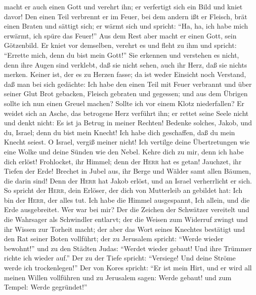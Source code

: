 macht er auch einen Gott und verehrt ihn; er verfertigt sich ein Bild
und kniet davor!  Den einen Teil verbrennt er im Feuer,
bei dem andern ißt er Fleisch, brät einen Braten und sättigt sich; er
wärmt sich und spricht: ``Ha, ha, ich habe mich erwärmt, ich spüre das
Feuer!''  Aus dem Rest aber macht er einen Gott, sein
Götzenbild. Er kniet vor demselben, verehrt es und fleht zu ihm und
spricht: ``Errette mich, denn du bist mein Gott!''  Sie
erkennen und verstehen es nicht, denn ihre Augen sind verklebt, daß sie
nicht sehen, auch ihr Herz, daß sie nichts merken. 
Keiner ist, der es zu Herzen fasse; da ist weder Einsicht noch Verstand,
daß man bei sich gedächte: Ich habe den einen Teil mit Feuer verbrannt
und über seiner Glut Brot gebacken, Fleisch gebraten und gegessen; und
aus dem Übrigen sollte ich nun einen Greuel machen? Sollte ich vor einem
Klotz niederfallen?  Er weidet sich an Asche, das
betrogene Herz verführt ihn; er rettet seine Seele nicht und denkt
nicht: Es ist ja Betrug in meiner Rechten!  Bedenke
solches, Jakob, und du, Israel; denn du bist mein Knecht! Ich habe dich
geschaffen, daß du mein Knecht seiest. O Israel, vergiß meiner nicht!
 Ich vertilge deine Übertretungen wie eine Wolke und
deine Sünden wie den Nebel. Kehre dich zu mir, denn ich habe dich
erlöst!  Frohlocket, ihr Himmel; denn der \textsc{Herr}
hat es getan! Jauchzet, ihr Tiefen der Erde! Brechet in Jubel aus, ihr
Berge und Wälder samt allen Bäumen, die darin sind! Denn der
\textsc{Herr} hat Jakob erlöst, und an Israel verherrlicht er sich.
 So spricht der \textsc{Herr}, dein Erlöser, der dich von
Mutterleib an gebildet hat: Ich bin der \textsc{Herr}, der alles tut.
Ich habe die Himmel ausgespannt, Ich allein, und die Erde ausgebreitet.
Wer war bei mir?  Der die Zeichen der Schwätzer vereitelt
und die Wahrsager als Schwindler entlarvt; der die Weisen zum Widerruf
zwingt und ihr Wissen zur Torheit macht;  der aber das
Wort seines Knechtes bestätigt und den Rat seiner Boten vollführt; der
zu Jerusalem spricht: ``Werde wieder bewohnt!'' und zu den Städten
Judas: ``Werdet wieder gebaut! Und ihre Trümmer richte ich wieder auf.''
 Der zu der Tiefe spricht: ``Versiege! Und deine Ströme
werde ich trockenlegen!''  Der von Kores spricht: ``Er
ist mein Hirt, und er wird all meinen Willen vollführen und zu Jerusalem
sagen: Werde gebaut! und zum Tempel: Werde gegründet!''

